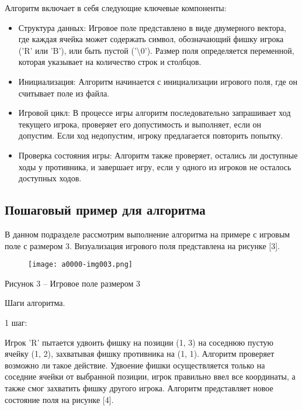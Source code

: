 \documentclass[a4paper]{article}
\begin{document}
Алгоритм включает в себя следующие ключевые компоненты:

\begin{itemize}[series=listWWNumvii,label=$\cdot $]
\item Структура данных: Игровое поле представлено в виде двумерного вектора, где каждая ячейка может содержать символ,
обозначающий фишку игрока ('R' или 'B'), или быть пустой ('{\textbackslash}0'). Размер поля определяется переменной,
которая указывает на количество строк и столбцов.
\item Инициализация: Алгоритм начинается с инициализации игрового поля, где он считывает поле из файла.
\item Игровой цикл: В процессе игры алгоритм последовательно запрашивает ход текущего игрока, проверяет его допустимость
и выполняет, если он допустим. Если ход недопустим, игроку предлагается повторить попытку.
\item Проверка состояния игры: Алгоритм также проверяет, остались ли доступные ходы у противника, и завершает игру, если
у одного из игроков не осталось доступных ходов.
\end{itemize}
\newpage 

\begin{center}
    \subsection{Пошаговый пример для алгоритма}
\end{center}

В данном подразделе рассмотрим выполнение алгоритма на примере с игровым поле с размером 3. Визуализация игрового поля
представлена на рисунке [3].

\begin{figure}[h]
    \centering
    \texttt{[image: a0000-img003.png]}
    \end{figure}
\par
{\centering
Рисунок 3 – Игровое поле размером 3
\par}

Шаги алгоритма.

1 шаг: 

Игрок 'R' пытается удвоить фишку на позиции (1, 3) на соседнюю пустую ячейку (1, 2), захватывая фишку противника на (1,
1). Алгоритм проверяет возможно ли такое действие. Удвоение фишки осуществляется только на соседние ячейки от выбранной
позиции, игрок правильно ввел все координаты, а также смог захватить фишку другого игрока. Алгоритм представляет
новое состояние поля на рисунке [4].
\end{document}
